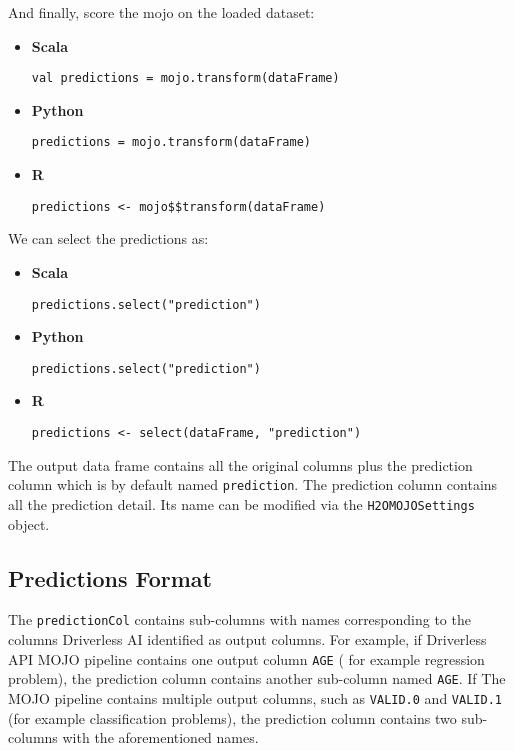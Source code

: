And finally, score the mojo on the loaded dataset:

\begin{itemize}
    \item \textbf{Scala} \begin{lstlisting}[style=Scala]
val predictions = mojo.transform(dataFrame)
    \end{lstlisting}
    \item \textbf{Python} \begin{lstlisting}[style=Python]
predictions = mojo.transform(dataFrame)
    \end{lstlisting}
    \item \textbf{R} \begin{lstlisting}[style=R]
predictions <- mojo$$transform(dataFrame)
    \end{lstlisting}
\end{itemize}

We can select the predictions as:

\begin{itemize}
    \item \textbf{Scala} \begin{lstlisting}[style=Scala]
predictions.select("prediction")
    \end{lstlisting}
    \item \textbf{Python} \begin{lstlisting}[style=Python]
predictions.select("prediction")
    \end{lstlisting}
    \item \textbf{R} \begin{lstlisting}[style=R]
predictions <- select(dataFrame, "prediction")
    \end{lstlisting}
\end{itemize}


The output data frame contains all the original columns plus the prediction column which is by default named
\texttt{prediction}. The prediction column contains all the prediction detail. Its name can be
modified via the \texttt{H2OMOJOSettings} object.

\subsection{Predictions Format}

The \texttt{predictionCol} contains sub-columns with
names corresponding to the columns Driverless AI identified as output columns. For example, if Driverless API MOJO
pipeline contains one output column \texttt{AGE} ( for example regression problem), the prediction column contains another sub-column
named \texttt{AGE}. If The MOJO pipeline contains multiple output columns, such as \texttt{VALID.0} and \texttt{VALID.1} (for example classification problems),
the prediction column contains two sub-columns with the aforementioned names.

